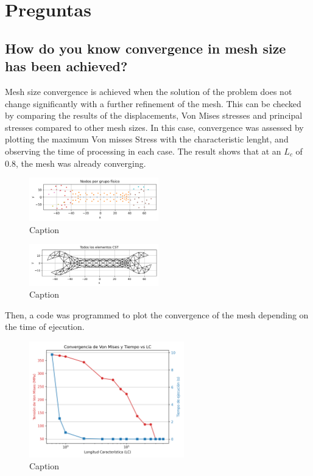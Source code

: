 \section{Preguntas}

\subsection{How do you know convergence in mesh size has been achieved?}

Mesh size convergence is achieved when the solution of the problem does not change significantly with a further refinement of the mesh. This can be checked by comparing the results of the displacements, Von Mises stresses and principal stresses compared to other mesh sizes. In this case, convergence was assessed by plotting the maximum Von misses Stress with the characteristic lenght, and observing the time of processing in each case. The result shows that at an $L_c$ of 0.8, the mesh was already converging.

\begin{figure}[H]
\centering
\includegraphics[width=0.5\textwidth]{GRAFICOS/Initial_nodes_por_grupo.png}
\caption{Caption}
\label{fig:wrench}
\end{figure}
  
\begin{figure}[H]
\centering
\includegraphics[width=0.5\textwidth]{GRAFICOS/Initial_elementos.png}
\caption{Caption}
\label{fig:deformed_shape}
\end{figure}
  
Then, a code was programmed to plot the convergence of the mesh depending on the time of ejecution.
  
\begin{figure}[H]
\centering
\includegraphics[width=0.6\textwidth]{GRAFICOS/convergencia.png}
\caption{Caption}
\label{fig:wrench}
\end{figure}

